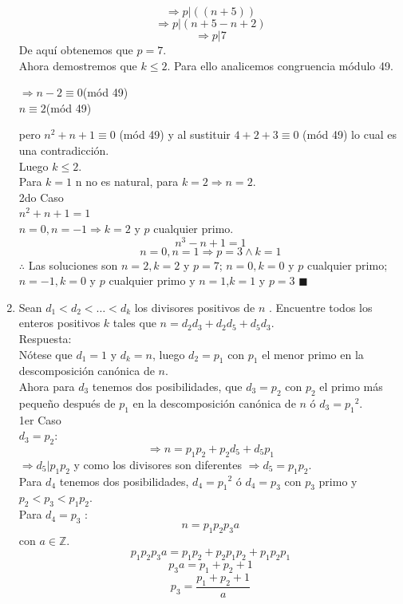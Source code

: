 \documentclass{book}
\newcommand{\Z}{\mathbb{Z}} \def\max{\mathop{\mbox{\rm máx}}} %
\begin{document}
\begin{enumerate}
        $$\Rightarrow p|((n+5) )$$
        $$\Rightarrow p|(n+5-n+2)$$
        $$\Rightarrow p|7$$
        De aquí obtenemos que $p=7$.\\
        Ahora demostremos que $k\leq 2$. Para ello analicemos congruencia módulo 49.
        \begin{center}
            $\Rightarrow n-2\equiv 0$(mód 49)\\
            $n\equiv 2$(mód 49)
        \end{center}
        pero $n^2+n+1\equiv 0$ (mód 49) y al sustituir $4+2+3\equiv 0$ (mód 49) lo cual es una contradicción.\\ Luego $k\leq 2$.\\
        Para $k=1$ n no es natural, para $k=2\Rightarrow     n=2$.\\
        2do Caso\\
        $n^2+n+1=1$\\
        $n=0,n=-1 \Rightarrow k=2$ y $p $ cualquier primo.
        $$n^3-n+1=1$$
        $$n=0,n=1\Rightarrow p=3\wedge k=1$$
        $\therefore$ Las soluciones son $n=2,k=2$ y $p=7$; $n=0,k=0$ y $ p$ cualquier primo; $n=-1,k=0$ y $p$ cualquier primo y $n=1$,$k=1$ y $p=3$ $\blacksquare$\\
        \item Sean $d_1<d_2< \ldots  <d_k$  los divisores positivos de $n$ . Encuentre todos los enteros positivos $k$  tales que                        $n=d_2d_3+d_2d_5+d_5d_3$.\\
        Respuesta:\\
        Nótese que $d_1=1$ y $d_k=n$, luego $d_2=p_1$ con $p_1$  el menor primo en la descomposición canónica de $n$.\\
        Ahora para $d_3$ tenemos dos posibilidades, que $d_3=p_2$ con $p_2$ el primo más pequeño después de $p_1$ en la descomposición canónica de $n$ ó $d_3={p_1}^2$.\\
        1er Caso\\
        $d_3=p_2$:
        $$\Rightarrow n=p_1 p_2+p_2 d_5+d_5 p_1$$
        $\Rightarrow d_5|p_1 p_2$ y como los divisores son diferentes $\Rightarrow d_5=p_1 p_2$.\\
        Para $d_4$  tenemos dos posibilidades, $d_4={p_1}^2$ ó $d_4= p_3$ con $p_3$ primo y $p_2<p_3<p_1 p_2$.\\
        Para $d_4=p_3$ :\\
        $$n=p_ 1 p_2 p_3 a$$ con $a\in\Z$.
        $$p_1 p_2 p_3 a=p_1 p_2+p_2 p_1 p_2+p_1 p_2 p_1$$
        $$p_3 a=p_1+p_2+1$$
        $$p_3=\frac{p_1+p_2+1}{a}$$

\end{enumerate}
\end{document}
